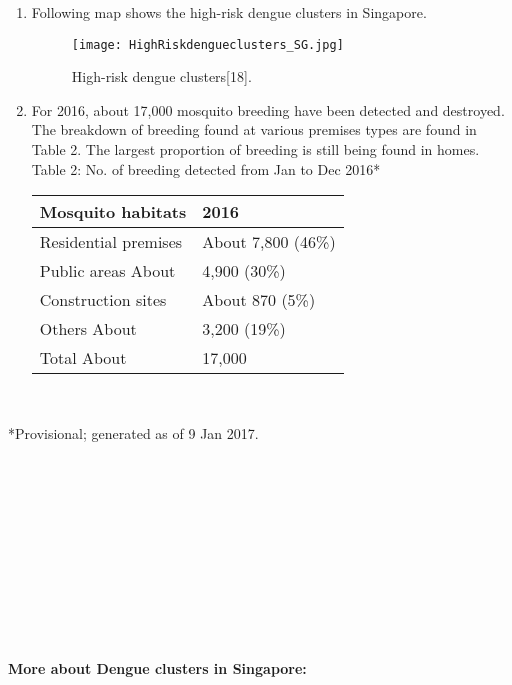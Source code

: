 \documentclass[11pt]{exam}
\begin{document}
\begin{questions}
\begin{enumerate}
\item Following map shows the high-risk dengue clusters in Singapore.
\begin{figure}[H]
  \centering
   \texttt{[image: HighRiskdengueclusters\_SG.jpg]}
  \caption{High-risk dengue clusters[18].}
   \label{fig:High-risk dengue clusters. }
\end{figure} 

\item For 2016, about 17,000 mosquito breeding have been detected and destroyed. The breakdown of
breeding found at various premises types are found in Table 2. 
The largest proportion of breeding is still being found in homes.\\ 

Table 2: No. of breeding detected from Jan to Dec 2016* \\

\begin{tabular}{ |p{5cm}|p{5cm}| }
\hline
Mosquito habitats & 2016  \\
\hline
Residential premises & About 7,800 (46\%)\\
Public areas About & 4,900 (30\%)\\
Construction sites & About 870 (5\%)\\
Others About & 3,200 (19\%)\\
Total About & 17,000\\
\hline
\end{tabular} \\ 
\end{enumerate}
*Provisional; generated as of 9 Jan 2017. \\ \\ \\ \\ \\ \\ \\ \\ \\ \\ \\ \\

\newpage
\textbf{More about Dengue clusters in Singapore:}\\


\end{questions}
\end{document}
